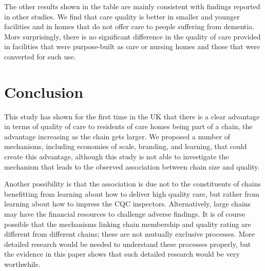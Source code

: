 \documentclass[a4paper,11pt,titlepage,british]{article}
\begin{document}
The other results shown in the table are mainly consistent with findings reported in other studies.  We find that care quality is better in smaller and younger facilities and in homes that do not offer care to people suffering from dementia.  More surprisingly, there is no significant difference in the quality of care provided in facilities that were purpose-built as care or nursing homes and those that were converted for such use.

\section{Conclusion}

This study has shown for the first time in the UK that there is a clear advantage in terms of quality of care to residents of care homes being part of a chain, the advantage increasing as the chain gets larger.  We proposed a number of mechanisms, including economies of scale, branding, and learning, that could create this advantage, although this study is not able to investigate the mechanism that leads to the observed association between chain size and quality.

Another possibility is that the association is due not to the constituents of chains benefitting from learning about how to deliver high quality care, but rather from learning about how to impress the CQC inspectors.  Alternatively, large chains may have the financial resources to challenge adverse findings.  It is of course possible that the mechanisms linking chain membership and quality rating are different from different chains; these are not mutually exclusive processes.  More detailed research would be needed to understand these processes properly, but the evidence in this paper shows that such detailed research would be very worthwhile.



\newpage

\printbibliography
\end{document}
